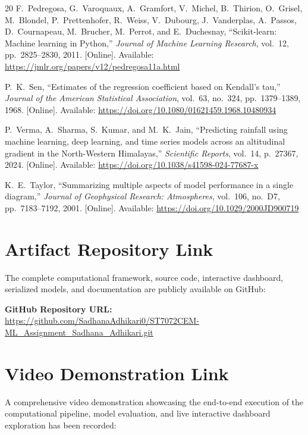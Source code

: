 \documentclass[conference]{IEEEtran}
\providecommand{\appendices}{\appendix}
\begin{document}
\begin{thebibliography}{20}
F.~Pedregosa, G.~Varoquaux, A.~Gramfort, V.~Michel, B.~Thirion, O.~Grisel, M.~Blondel, P.~Prettenhofer, R.~Weiss, V.~Dubourg, J.~Vanderplas, A.~Passos, D.~Cournapeau, M.~Brucher, M.~Perrot, and E.~Duchesnay, ``Scikit-learn: Machine learning in Python,'' \emph{Journal of Machine Learning Research}, vol.~12, pp.~2825--2830, 2011. [Online]. Available: \url{https://jmlr.org/papers/v12/pedregosa11a.html}

P.~K.~Sen, ``Estimates of the regression coefficient based on Kendall's tau,'' \emph{Journal of the American Statistical Association}, vol.~63, no.~324, pp.~1379--1389, 1968. [Online]. Available: \url{https://doi.org/10.1080/01621459.1968.10480934}

P.~Verma, A.~Sharma, S.~Kumar, and M.~K.~Jain, ``Predicting rainfall using machine learning, deep learning, and time series models across an altitudinal gradient in the North-Western Himalayas,'' \emph{Scientific Reports}, vol.~14, p.~27367, 2024. [Online]. Available: \url{https://doi.org/10.1038/s41598-024-77687-x}

K.~E.~Taylor, ``Summarizing multiple aspects of model performance in a single diagram,'' \emph{Journal of Geophysical Research: Atmospheres}, vol.~106, no.~D7, pp.~7183--7192, 2001. [Online]. Available: \url{https://doi.org/10.1029/2000JD900719}

\end{thebibliography}

\appendices
\clearpage
\section{Artifact Repository Link}
\label{app:github}
The complete computational framework, source code, interactive dashboard, serialized models, and documentation are publicly available on GitHub:

\noindent\textbf{GitHub Repository URL:} \\
\url{https://github.com/SadhanaAdhikari0/ST7072CEM-ML_Assignment_Sadhana_Adhikari.git}

\clearpage
\section{Video Demonstration Link}
\label{app:video}
A comprehensive video demonstration showcasing the end-to-end execution of the computational pipeline, model evaluation, and live interactive dashboard exploration has been recorded:
\end{document}
